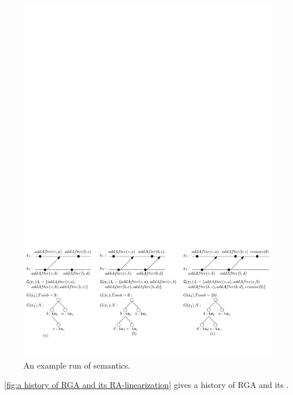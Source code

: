 \begin{figure}[t]
  \centering
  \includegraphics[width=0.9 \textwidth]{figures/ExplainSemantics.pdf}
\vspace{-10pt}
  \caption{An example run of semantics.}
  \label{fig:an example run of semantics}
\end{figure}


\figurename~\ref{fig:a history of RGA and its RA-linearization} gives a history of RGA and its \crdtlinearization{}.


